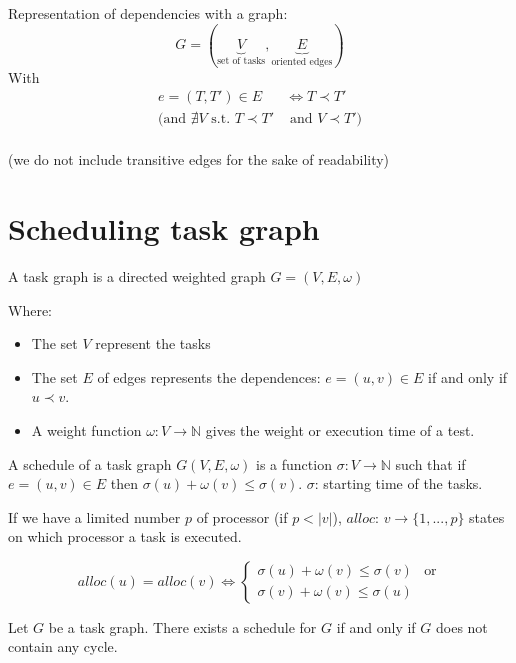 Representation of dependencies with a graph:
\[G=(\underbrace{V}_{\text{set of tasks}},\underbrace{E}_{\text{oriented edges}})\]
With
\begin{align*}
e=(T,T')\in E & \Leftrightarrow T \prec T'\\
\big(\text{and } \nexists V \text{ s.t. } T\prec T' & \text{ and } V \prec T' \big)\\
\end{align*}

(we do not include transitive edges for the sake of readability)

\section{Scheduling task graph}
\begin{defi}
A task graph is a directed weighted graph $G=(V,E,\omega )$

Where:
\begin{itemize}
\item The set $V$ represent the tasks
\item The set $E$ of edges represents the dependences: $e=(u,v) \in E $ if and only if $u\prec v$.
\item A weight function $\omega : V \to \mathbb{N} $ gives the weight or execution time of a test.
\end{itemize}
\end{defi}

\begin{defi}
A schedule of a task graph $G(V,E,\omega)$ is a function
$\sigma : V\to \mathbb{N}$ such that if $e=(u,v) \in E$ then $\sigma (u) + \omega (v) \leq \sigma (v)$. $\sigma$: starting time of the tasks.
\end{defi}

If we have a limited number $p$ of processor (if $p<|v|$), $alloc$: $v\to \{1,...,p\}$ states on which processor a task is executed.

\[alloc(u) = alloc (v) \Leftrightarrow 
\begin{cases}
\sigma(u) + \omega(v) \leq \sigma(v) & \text{or}\\
\sigma(v) + \omega(v) \leq \sigma(u)
\end{cases}\]

\begin{thm}
Let $G$ be a task graph. There exists a schedule for $G$ if and only if $G$ does not contain any cycle.
\end{thm}


